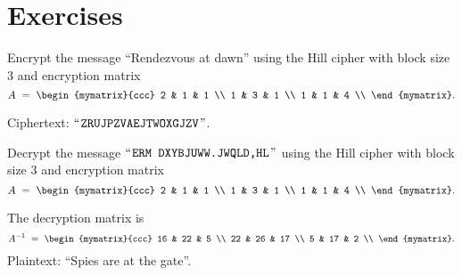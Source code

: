 \section*{Exercises}

\begin{ex}
  Encrypt the message ``Rendezvous at dawn'' using the Hill cipher with
  block size 3 and encryption matrix
  \begin{equation*}
    A ~=~ \begin{mymatrix}{ccc}
      2 & 1 & 1 \\
      1 & 3 & 1 \\
      1 & 1 & 4 \\
    \end{mymatrix}.
  \end{equation*}
  \begin{sol}
    Ciphertext: $\mbox{\rm``\hspace{.08333em}{\tt ZRUJPZVAEJTWOXGJZV}\hspace{.08333em}''}$.
  \end{sol}
\end{ex}

\begin{ex}
  Decrypt the message $\mbox{\rm``\hspace{.08333em}{\tt ERM DXYBJUWW.JWQLD,HL}\hspace{.08333em}''}$ using the Hill
  cipher with block size $3$ and encryption matrix
  \begin{equation*}
    A ~=~ \begin{mymatrix}{ccc}
      2 & 1 & 1 \\
      1 & 3 & 1 \\
      1 & 1 & 4 \\
    \end{mymatrix}.
  \end{equation*}
  \begin{sol}
    The decryption matrix is
    \begin{equation*}
      A^{-1} ~=~ \begin{mymatrix}{ccc}
        16 & 22 &  5 \\
        22 & 26 & 17 \\
        5  & 17 &  2 \\
      \end{mymatrix}.
    \end{equation*}
    Plaintext: ``Spies are at the gate''.
  \end{sol}
\end{ex}

